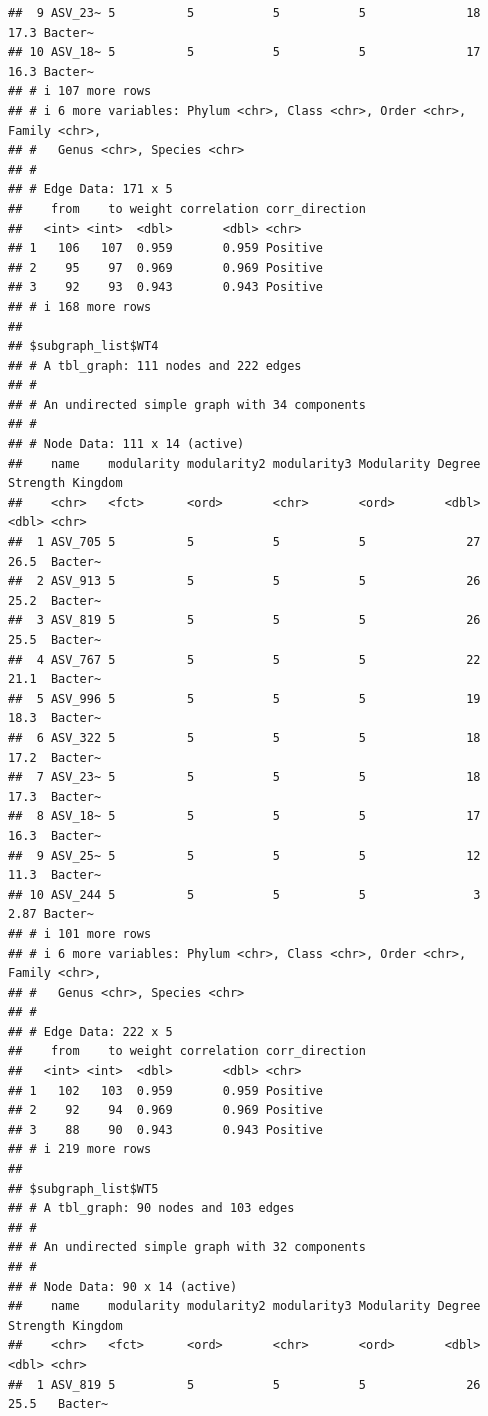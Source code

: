 \documentclass[
]{book}
\begin{document}
\begin{verbatim}
##  9 ASV_23~ 5          5           5           5              18     17.3 Bacter~
## 10 ASV_18~ 5          5           5           5              17     16.3 Bacter~
## # i 107 more rows
## # i 6 more variables: Phylum <chr>, Class <chr>, Order <chr>, Family <chr>,
## #   Genus <chr>, Species <chr>
## #
## # Edge Data: 171 x 5
##    from    to weight correlation corr_direction
##   <int> <int>  <dbl>       <dbl> <chr>         
## 1   106   107  0.959       0.959 Positive      
## 2    95    97  0.969       0.969 Positive      
## 3    92    93  0.943       0.943 Positive      
## # i 168 more rows
## 
## $subgraph_list$WT4
## # A tbl_graph: 111 nodes and 222 edges
## #
## # An undirected simple graph with 34 components
## #
## # Node Data: 111 x 14 (active)
##    name    modularity modularity2 modularity3 Modularity Degree Strength Kingdom
##    <chr>   <fct>      <ord>       <chr>       <ord>       <dbl>    <dbl> <chr>  
##  1 ASV_705 5          5           5           5              27    26.5  Bacter~
##  2 ASV_913 5          5           5           5              26    25.2  Bacter~
##  3 ASV_819 5          5           5           5              26    25.5  Bacter~
##  4 ASV_767 5          5           5           5              22    21.1  Bacter~
##  5 ASV_996 5          5           5           5              19    18.3  Bacter~
##  6 ASV_322 5          5           5           5              18    17.2  Bacter~
##  7 ASV_23~ 5          5           5           5              18    17.3  Bacter~
##  8 ASV_18~ 5          5           5           5              17    16.3  Bacter~
##  9 ASV_25~ 5          5           5           5              12    11.3  Bacter~
## 10 ASV_244 5          5           5           5               3     2.87 Bacter~
## # i 101 more rows
## # i 6 more variables: Phylum <chr>, Class <chr>, Order <chr>, Family <chr>,
## #   Genus <chr>, Species <chr>
## #
## # Edge Data: 222 x 5
##    from    to weight correlation corr_direction
##   <int> <int>  <dbl>       <dbl> <chr>         
## 1   102   103  0.959       0.959 Positive      
## 2    92    94  0.969       0.969 Positive      
## 3    88    90  0.943       0.943 Positive      
## # i 219 more rows
## 
## $subgraph_list$WT5
## # A tbl_graph: 90 nodes and 103 edges
## #
## # An undirected simple graph with 32 components
## #
## # Node Data: 90 x 14 (active)
##    name    modularity modularity2 modularity3 Modularity Degree Strength Kingdom
##    <chr>   <fct>      <ord>       <chr>       <ord>       <dbl>    <dbl> <chr>  
##  1 ASV_819 5          5           5           5              26   25.5   Bacter~

\end{verbatim}
\end{document}
